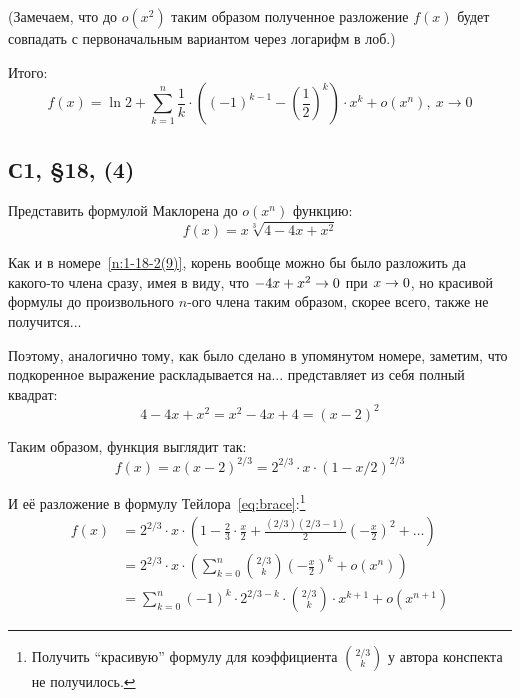 \documentclass[a4paper,12pt]{article}
\begin{document}
\begin{solution}
    (Замечаем, что до $o(x^2)$ таким образом полученное разложение $f(x)$ будет совпадать с первоначальным вариантом через логарифм в лоб.)
    
    Итого:
    \[
      f(x) = \ln 2 + \sum_{k = 1}^n \frac{1}{k} \cdot \left((-1)^{k - 1} - \left(\frac{1}{2}\right)^k\right) \cdot x^k + o(x^n),\ x \to 0
    \]
  \end{solution}
  
  
  
  \subsection{С1, \S 18, (4)}
  
  Представить формулой Маклорена до $o(x^n)$ функцию:
  \[
    f(x) = x \sqrt[3]{4 - 4x + x^2}
  \]
  
  \begin{solution}
    Как и в номере~\ref{n:1-18-2(9)}, корень вообще можно бы было разложить да какого-то члена сразу, имея в виду, что $-4x \hm+ x^2 \hm\to 0$ при $x \hm\to 0$, но красивой формулы до произвольного $n$-ого члена таким образом, скорее всего, также не получится...
    
    Поэтому, аналогично тому, как было сделано в упомянутом номере, заметим, что подкоренное выражение раскладывается на... представляет из себя полный квадрат:
    \[
      4 - 4x + x^2 = x^2 - 4x + 4 = (x - 2)^2
    \]
    
    Таким образом, функция выглядит так:
    \[
      f(x) = x (x - 2)^{2/3} = 2^{2/3} \cdot x \cdot (1 - x/2)^{2/3}
    \]
    
    И её разложение в формулу Тейлора~\eqref{eq:brace}:\footnote{
      Получить ``красивую'' формулу для коэффициента $\binom{2/3}{k}$ у автора конспекта не получилось.
    }
    \begin{equation*}
    \begin{split}
      f(x) &= 2^{2/3} \cdot x \cdot \left(1 - \frac{2}{3} \cdot \frac{x}{2} + \frac{(2/3)(2/3 - 1)}{2} \left(-\frac{x}{2}\right)^2 + \ldots\right)\\
        &= 2^{2/3} \cdot x \cdot \left(\sum_{k = 0}^n \binom{2/3}{k} \left(-\frac{x}{2}\right)^k + o(x^n)\right)\\
        &= \sum_{k = 0}^n (-1)^k \cdot 2^{2/3 - k} \cdot \binom{2/3}{k} \cdot x^{k + 1} + o(x^{n + 1})
    \end{split}
    \end{equation*}
  \end{solution}
  
\end{document}
